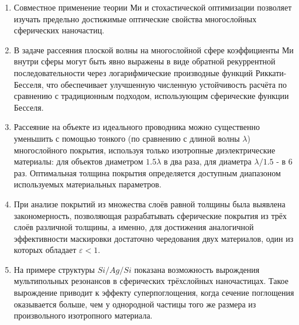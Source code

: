 {}  %
\mynobreakpar\begin{enumerate}
  \item Совместное применение теории Ми и стохастической оптимизации
    позволяет изучать предельно достижимые оптические свойства многослойных
    сферических наночастиц.
  \item В задаче рассеяния плоской волны на многослойной сфере
    коэффициенты Ми внутри сферы могут быть явно выражены в виде
    обратной рекуррентной последовательности через логарифмические
    производные функций Риккати-Бесселя, что обеспечивает улучшенную
    численную устойчивость расчёта по сравнению с традиционным
    подходом, использующим сферические функции Бесселя. %
  \item Рассеяние на объекте из идеального проводника можно
    существенно уменьшить с помощью тонкого (по сравнению с длиной
    волны $\lambda$) многослойного покрытия, используя только
    изотропные диэлектрические материалы: для объектов диаметром
    $1.5\lambda$ в два раза, для диаметра $\lambda/1.5$ - в 6
    раз. Оптимальная толщина покрытия определяется доступным
    диапазоном используемых материальных параметров.
  \item 
    При анализе покрытий из множества слоёв равной толщины
    была выявлена закономерность, позволяющая разрабатывать
    сферические покрытия из трёх слоёв различной толщины, а именно,
    для достижения аналогичной эффективности маскировки достаточно
    чередования двух материалов, один из которых обладает
    $\varepsilon<1$. 

  \item На примере структуры $Si/Ag/Si$ показана возможность
    вырождения мультипольных резонансов в сферических трёхслойных
    наночастицах. Такое вырождение приводит к эффекту суперпоглощения,
    когда сечение поглощения оказывается больше, чем у однородной
    частицы того же размера из произвольного изотропного материала.
\end{enumerate}


